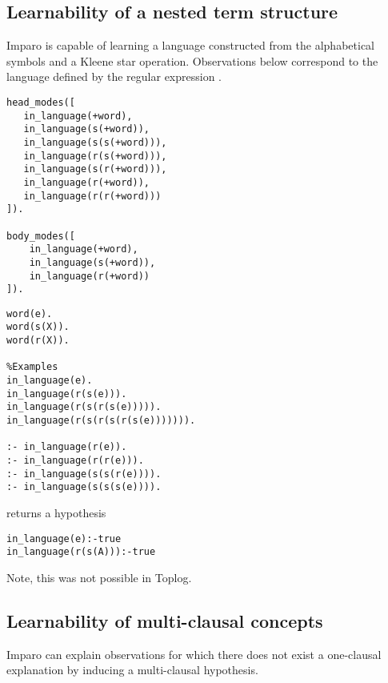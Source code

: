 \subsection{Learnability of a nested term structure}
Imparo is capable of learning a language constructed from the alphabetical symbols and a Kleene star operation. Observations below correspond to the language defined by the regular expression .

\begin{minipage}[t]{.50\textwidth}
\begin{lstlisting}
head_modes([
   in_language(+word),
   in_language(s(+word)),  
   in_language(s(s(+word))),
   in_language(r(s(+word))),
   in_language(s(r(+word))),
   in_language(r(+word)),
   in_language(r(r(+word)))
]).

body_modes([
    in_language(+word),
    in_language(s(+word)),
    in_language(r(+word))
]).
\end{lstlisting}
\end{minipage}
\begin{minipage}[t]{.40\textwidth}
\begin{lstlisting}
word(e).
word(s(X)).
word(r(X)).

%Examples
in_language(e).
in_language(r(s(e))).
in_language(r(s(r(s(e))))).
in_language(r(s(r(s(r(s(e))))))).

:- in_language(r(e)).
:- in_language(r(r(e))).
:- in_language(s(s(r(e)))).
:- in_language(s(s(s(e)))).
\end{lstlisting}
\end{minipage}


returns a hypothesis
\begin{lstlisting}
in_language(e):-true
in_language(r(s(A))):-true
\end{lstlisting}

Note, this was not possible in Toplog.

\subsection{Learnability of multi-clausal concepts}
Imparo can explain observations for which there does not exist a one-clausal explanation by inducing a multi-clausal hypothesis.

